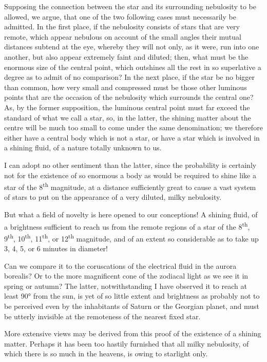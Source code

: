 \documentclass[a4paper, 12pt, oneside, polutonikogreek, english]{article}
\begin{document}
Supposing the connection between the star and its surrounding nebulosity to be allowed, we argue, that one of the two following cases must necessarily be admitted. In the first place, if the nebulosity consists of stars that are very remote, which appear nebulous on account of the small angles their mutual distances subtend at the eye, whereby they will not only, as it were, run into one another, but also appear extremely faint and diluted; then, what must be the enormous size of the central point, which outshines all the rest in so superlative a degree as to admit of no comparison? In the next place, if the star be no bigger than common, how very small and compressed must be those other luminous points that are the occasion of the nebulosity which surrounds the central one? As, by the former supposition, the luminous central point must far exceed the standard of what we call a star, so, in the latter, the shining matter about the centre will be much too small to come under the same denomination; we therefore either have a central body which is not a star, or have a star which is involved in a shining fluid, of a nature totally unknown to us.

I can adopt no other sentiment than the latter, since the probability is certainly not for the existence of so enormous a body as would be required to shine like a star of the 8\textsuperscript{th} magnitude, at a distance sufficiently great to cause a vast system of stars to put on the appearance of a very diluted, milky nebulosity.

But what a field of novelty is here opened to our conceptions! A shining fluid, of a brightness sufficient to reach us from the remote regions of a star of the 8\textsuperscript{th}, 9\textsuperscript{th}, 10\textsuperscript{th}, 11\textsuperscript{th}, or 12\textsuperscript{th} magnitude, and of an extent so considerable as to take up 3, 4, 5, or 6 minutes in diameter!

Can we compare it to the coruscations of the electrical fluid in the aurora borealis? Or to the more magnificent cone of the zodiacal light as we see it in spring or autumn? The latter, notwithstanding I have observed it to reach at least 90° from the sun, is yet of so little extent and brightness as probably not to be perceived even by the inhabitants of Saturn or the Georgian planet, and must be utterly invisible at the remoteness of the nearest fixed star.

More extensive views may be derived from this proof of the existence of a shining matter. Perhaps it has been too hastily furnished that all milky nebulosity, of which there is so much in the heavens, is owing to starlight only.
\end{document}
